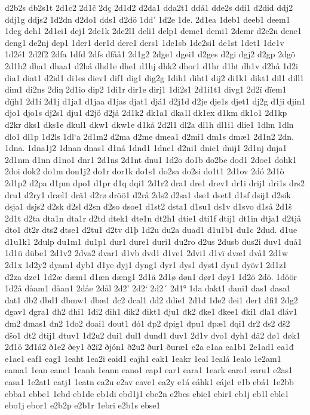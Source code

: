 d2b2s
db2s1t
2d1c2
2d1č
2dç
2d1d2
d2da1
dda2t1
ddá1
dde2s
ddi1
d2did
ddj2
ddj1g
ddjs2
1d2dn
d2do1
dds1
d2dö
1dd'
1d2e
1de.
2d1ea
1deb1
deeb1
deem1
1deg
deh1
2d1ei1
dej1
2de1k
2de2l1
deli1
delp1
deme1
demi1
2demr
d2e2n
dene1
deng1
de2nj
dep1
1der1
der1d
dere1
ders1
1de1sb
1de2si1
de1st
1det1
1de1v
1d2é1
2d2f2
2dfa
1dfd
2dfs
dfåå1
2d1g2
2dge1
dgei1
d2ges
d2gi
dgj2
d2gp
2dgö
2d1h2
dha1
dhaa1
d2há
dhd1e
dhe1
d1hj
dhk2
dhor1
d1hr
d1ht
dh1v
d2hå
1d2i
dia1
diat1
d2id1
di1es
diev1
dif1
dig1
dig2g
1dih1
diht1
dij2
di1k1
dikt1
dil1
dill1
dim1
di2ns
2diŋ
2d1io
dip2
1di1r
dir1e
dirj1
1di2s1
2d1i1t1
divg1
2d2ï
dïem1
dïjh1
2d1í
2d1j
d1ja1
d1jaa
d1jas
djat1
djá1
d2j1d
d2je
dje1s
djet1
dj2g
d1ji
djin1
djo1
djo1s
dj2s1
dju1
d2jö
d2jå
2d1k2
dk1a1
dka1l
dk1ex
d1km
dk1o1
2d1kp
d2kr
dks1
dks1e
dkul1
dkw1
dkw1e
d1kå
2d2l1
dl2a
dl1h
dl1i1
dlie1
1dlm
1dln
dlo1
dl1p
1d2ls
1dl`a
2d1m2
d2ma
d2me
dmea1
d2mi1
dm1s
dmæ1
2d1n2
2dn.
1dna.
1dna1j2
1dnan
dnas1
d1ná
1dnd1
1dne1
d2ni1
dnie1
dnij1
2d1nj
dnja1
2d1nm
d1nn
d1no1
dnr1
2d1ns
2d1nt
dnu1
1d2o
do1b
do2be
dod1
2doe1
dohk1
2doi
dok2
do1m
don1j2
do1r
dor1k
do1s1
do2sa
do2si
do1t1
2d1ov
2dó
2d1ò
2d1p2
d2pa
d1pm
dpo1
d1pr
d1q
dqi1
2d1r2
dra1
dre1
drev1
dr1i
drij1
dri1s
drs2
dru1
d2ry1
dræl1
drä1
d2rø
dröö1
d2rå
2ds2
d2sa1
dse1
dset1
d1sf
dsij1
d2sik
dsja1
dsjs2
d2sk
d2sl
d2sn
d2so
dsoe1
d1st2
dsta1
d1su1
ds1v
d1svo
d1så
2d1š
2d1t
d2ta
dta1n
dta1r
d2td
dtek1
dte1n
dt2h1
dtie1
dti1f
dtij1
dt1in
dtja1
d2tjå
dto1
dt2r
dts2
dtse1
d2tu1
d2tv
d1þ
1d2u
du2a
duad1
d1u1b1
du1c
2dud.
d1ue
d1u1k1
2dulp
du1m1
du1p1
dur1
dure1
duri1
du2ro
d2us
2dusb
dus2i
duv1
duå1
1d1ü
dübe1
2d1v2
2dva2
dvar1
d1vb
dvd1
d1ve1
2dvi1
d1vï
dvæ1
dvå1
2d1w
2d1x
1d2y2
dyam1
dyb1
d1ye
dyj1
dyng1
dyr1
dys1
dyst1
dyu1
dyöv1
2d1z1
d2za
dze1
1d2æ
dæm1
d1æn
dæng1
2d1ä
2d1ø
døn1
dør1
døy1
1d2ö
2dö.
1döör
1d2å
dåam1
dåan1
2dåe
2dål
2d2'
2d2`
2d2´
2d1°
1đa
đakt1
đani1
đas1
đasa1
đat1
đb2
đbd1
đbmw1
đbæ1
đc2
đcal1
đd2
đdie1
2đ1đ
1đe2
đei1
đer1
đfi1
2đg2
đgav1
đgra1
đh2
đhi1
1đi2
đih1
đik2
đikt1
đju1
đk2
đke1
đkee1
đki1
đla1
đláv1
đm2
đmas1
đn2
1đo2
đoai1
đout1
đó1
đp2
đpig1
đpu1
đpæ1
đqi1
đr2
đs2
đš2
đšo1
đt2
đtij1
đtuv1
1đ2u2
đui1
đul1
đund1
đuv1
2đ1v
đvo1
đyh1
đä2
đø1
đøk1
2đ1ö
2đ1å2
ð1e2
ðey1
ð2i2
ðjón1
ð2u2
ður1
ðuræ1
e2a
e1aa
ea1b1
2e1ad1
ea1đ
e1ae1
eaf1
eag1
1eaht
1ea2i
eaid1
eajh1
eak1
1eakr
1eal
1ealá
1ealo
1e2am1
eama1
1ean
eane1
1eanh
1eann
eano1
eap1
ear1
eara1
1eark
earo1
earu1
e2as1
easa1
1e2at1
eatj1
1eatn
ea2u
e2av
eave1
ea2y
e1á
eáhk1
eáje1
e1b
ebá1
1e2bb
ebba1
ebbe1
1ebd
eb1de
eb1di
ebd1j1
ebe2n
e2bes
ebie1
ebir1
eb1j
eb1l
eble1
ebo1j
ebor1
e2b2p
e2b1r
1ebri
e2b1s
ebse1
